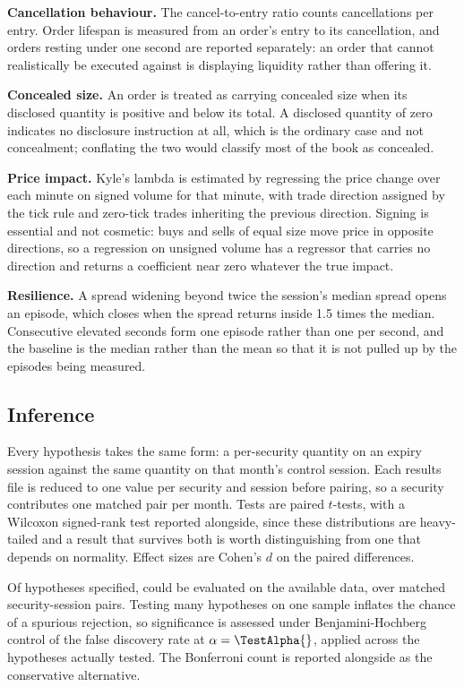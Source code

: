 \documentclass[11pt,a4paper]{article}
\begin{document}
\textbf{Cancellation behaviour.} The cancel-to-entry ratio counts cancellations per entry.
Order lifespan is measured from an order's entry to its cancellation, and orders resting
under one second are reported separately: an order that cannot realistically be executed
against is displaying liquidity rather than offering it.

\textbf{Concealed size.} An order is treated as carrying concealed size when its disclosed
quantity is positive and below its total. A disclosed quantity of zero indicates no
disclosure instruction at all, which is the ordinary case and not concealment; conflating
the two would classify most of the book as concealed.

\textbf{Price impact.} Kyle's lambda is estimated by regressing the price change over each
minute on signed volume for that minute, with trade direction assigned by the tick rule and
zero-tick trades inheriting the previous direction. Signing is essential and not cosmetic:
buys and sells of equal size move price in opposite directions, so a regression on unsigned
volume has a regressor that carries no direction and returns a coefficient near zero
whatever the true impact.

\textbf{Resilience.} A spread widening beyond twice the session's median spread opens an
episode, which closes when the spread returns inside 1.5 times the median. Consecutive
elevated seconds form one episode rather than one per second, and the baseline is the median
rather than the mean so that it is not pulled up by the episodes being measured.

\subsection{Inference}

Every hypothesis takes the same form: a per-security quantity on an expiry session against
the same quantity on that month's control session. Each results file is reduced to one value
per security and session before pairing, so a security contributes one matched pair per
month. Tests are paired \(t\)-tests, with a Wilcoxon signed-rank test reported alongside,
since these distributions are heavy-tailed and a result that survives both is worth
distinguishing from one that depends on normality. Effect sizes are Cohen's \(d\) on the
paired differences.

Of \TestSpecified{} hypotheses specified, \TestEvaluated{} could be evaluated on the
available data, over \TestPairsTotal{} matched security-session pairs. Testing many
hypotheses on one sample inflates the chance of a spurious rejection, so significance is
assessed under Benjamini-Hochberg control of the false discovery rate at
\(\alpha = \TestAlpha{}\), applied across the hypotheses actually tested. The Bonferroni
count is reported alongside as the conservative alternative.
\end{document}
